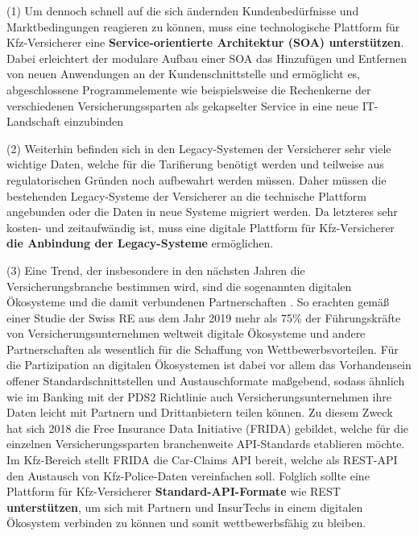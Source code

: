 
(1) Um dennoch schnell auf die sich ändernden Kundenbedürfnisse und Marktbedingungen reagieren zu können, muss eine technologische Plattform für Kfz-Versicherer eine \textbf{Service-orientierte Architektur (SOA) unterstützen}. Dabei erleichtert der modulare Aufbau einer SOA das Hinzufügen und Entfernen von neuen Anwendungen an der Kundenschnittstelle \autocite[Vgl.][S. 392]{WARG2016} und ermöglicht es, abgeschlossene Programmelemente wie beispielsweise die Rechenkerne der verschiedenen Versicherungssparten als gekapselter Service in eine neue IT-Landschaft einzubinden \autocite[Vgl.][S. 10f]{URLA2019}

(2) Weiterhin befinden sich in den Legacy-Systemen der Versicherer sehr viele wichtige Daten, welche für die Tarifierung benötigt werden und teilweise aus regulatorischen Gründen noch aufbewahrt werden müssen. Daher müssen die bestehenden Legacy-Systeme der Versicherer an die technische Plattform angebunden oder die Daten in neue Systeme migriert werden. Da letzteres sehr kosten- und zeitaufwändig ist, muss eine digitale Plattform für Kfz-Versicherer \textbf{die Anbindung der Legacy-Systeme} ermöglichen. \autocite[Vgl.][S. 10-12]{GUNTER2020}

(3) Eine Trend, der insbesondere in den nächsten Jahren die Versicherungsbranche bestimmen wird, sind die sogenannten digitalen Ökosysteme und die damit verbundenen Partnerschaften \autocite[Vgl.][]{AVRAMAKIS2023}.  So erachten gemäß einer Studie der Swiss RE aus dem Jahr 2019 mehr als 75\% der Führungskräfte von Versicherungsunternehmen weltweit digitale Ökosysteme und andere Partnerschaften als wesentlich für die Schaffung von Wettbewerbsvorteilen. \autocite[Vgl.][]{PAYNE2022} Für die Partizipation an digitalen Ökosystemen ist dabei vor allem das Vorhandensein offener Standardschnittstellen und Austauschformate maßgebend, sodass ähnlich wie im Banking mit der PDS2 Richtlinie auch Versicherungsunternehmen ihre Daten leicht mit Partnern und Drittanbietern teilen können. Zu diesem Zweck hat sich 2018 \autocite[Vgl.][]{2021z} die Free Insurance Data Initiative (FRIDA) gebildet, welche für die einzelnen Versicherungssparten branchenweite API-Standards etablieren möchte. Im Kfz-Bereich stellt FRIDA die Car-Claims API bereit, welche als REST-API den Austausch von Kfz-Police-Daten vereinfachen soll. Folglich sollte eine Plattform für Kfz-Versicherer \textbf{Standard-API-Formate} wie REST \textbf{unterstützen}, um sich mit Partnern und InsurTechs in einem digitalen Ökosystem verbinden zu können und somit wettbewerbsfähig zu bleiben. \autocite[Vgl.][]{KRETZ2023}

